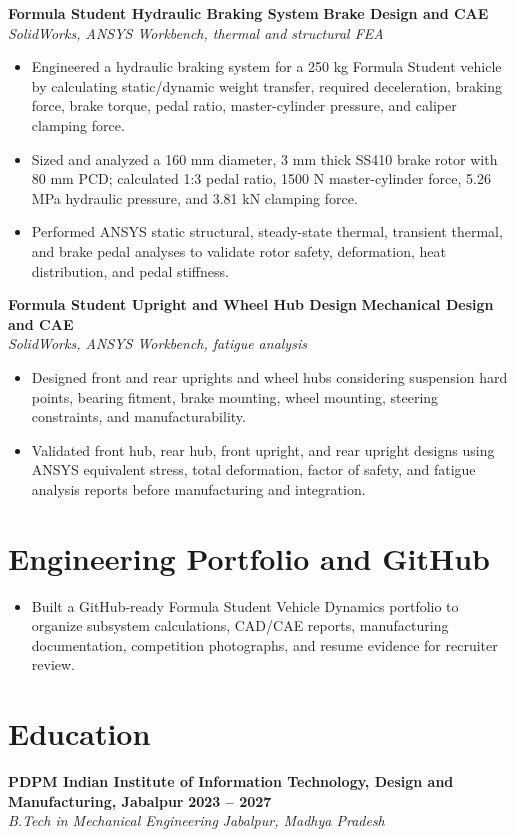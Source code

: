 \documentclass[9pt,a4paper]{extarticle}
\newcommand{\resumeSubheading}[4]{\vspace{1pt}\textbf{#1} \hfill \textbf{#2}\\[-2pt]\textit{#3} \hfill \textit{#4}\vspace{-2pt}}
\newcommand{\resumeProject}[3]{\vspace{1pt}\textbf{#1} \hfill \textbf{#2}\\[-2pt]\textit{#3}\vspace{-3pt}}
\begin{document}
\resumeProject{Formula Student Hydraulic Braking System}{Brake Design and CAE}{SolidWorks, ANSYS Workbench, thermal and structural FEA}
\begin{itemize}
    \item Engineered a hydraulic braking system for a 250 kg Formula Student vehicle by calculating static/dynamic weight transfer, required deceleration, braking force, brake torque, pedal ratio, master-cylinder pressure, and caliper clamping force.
    \item Sized and analyzed a 160 mm diameter, 3 mm thick SS410 brake rotor with 80 mm PCD; calculated 1:3 pedal ratio, 1500 N master-cylinder force, 5.26 MPa hydraulic pressure, and 3.81 kN clamping force.
    \item Performed ANSYS static structural, steady-state thermal, transient thermal, and brake pedal analyses to validate rotor safety, deformation, heat distribution, and pedal stiffness.
\end{itemize}

\resumeProject{Formula Student Upright and Wheel Hub Design}{Mechanical Design and CAE}{SolidWorks, ANSYS Workbench, fatigue analysis}
\begin{itemize}
    \item Designed front and rear uprights and wheel hubs considering suspension hard points, bearing fitment, brake mounting, wheel mounting, steering constraints, and manufacturability.
    \item Validated front hub, rear hub, front upright, and rear upright designs using ANSYS equivalent stress, total deformation, factor of safety, and fatigue analysis reports before manufacturing and integration.
\end{itemize}

\section*{Engineering Portfolio and GitHub}
\begin{itemize}
    \item Built a GitHub-ready Formula Student Vehicle Dynamics portfolio to organize subsystem calculations, CAD/CAE reports, manufacturing documentation, competition photographs, and resume evidence for recruiter review.
\end{itemize}

\section*{Education}
\resumeSubheading{PDPM Indian Institute of Information Technology, Design and Manufacturing, Jabalpur}{2023 -- 2027}{B.Tech in Mechanical Engineering}{Jabalpur, Madhya Pradesh}
\end{document}
